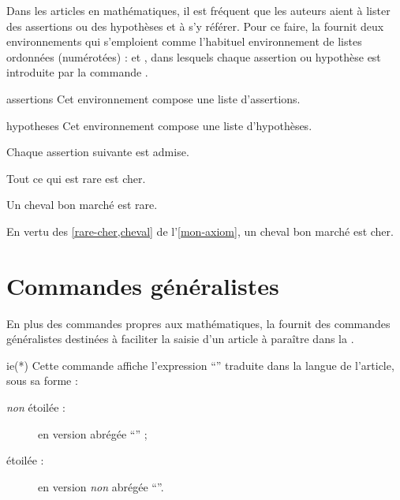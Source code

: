 Dans les articles en mathématiques, il est fréquent que les auteurs aient
à lister des assertions ou des hypothèses et à s'y référer. Pour ce faire, la
\nwejmauthorcl{} fournit deux environnements qui s'emploient comme l'habituel
environnement  de listes ordonnées (numérotées) :
 et , dans lesquels chaque assertion ou
hypothèse est introduite par la commande .

\begin{docEnvironment}[doclang/environment content=assertions]{assertions}{}
  Cet environnement compose une liste d'assertions.
\end{docEnvironment}
\begin{docEnvironment}[doclang/environment content=hypothèses]{hypotheses}{}
  Cet environnement compose une liste d'hypothèses.
\end{docEnvironment}

\begin{bodycode}[listing and text,listing options={deletekeywords={[1]{label}}}]
\begin{axiom}\label{mon-axiom}
  Chaque assertion suivante est admise.
  \begin{assertions}
  \item\label{rare-cher} Tout ce qui est rare est cher.
  \item\label{cheval} Un cheval bon marché est rare.
  \end{assertions}
\end{axiom}
En vertu des \vref{rare-cher,cheval} de l'\vref{mon-axiom},
un cheval bon marché est cher.
\end{bodycode}

\section{Commandes généralistes}
\label{sec:comm-gener}

En plus des commandes propres aux mathématiques, la \nwejmauthorcl{} fournit des
commandes généralistes destinées à faciliter la saisie d'un article à paraître
dans la \nwejm{}.

\begin{docCommand}{ie(*)}{}
  Cette commande affiche l'expression \enquote{\ie*{}} traduite dans la langue
  de l'article, sous sa forme :
  \begin{description}
  \item[\emph{non} étoilée :] en version abrégée \enquote{\ie{}} ;
  \item[étoilée :] en version \emph{non} abrégée \enquote{\ie*{}}.
  \end{description}
\end{docCommand}


